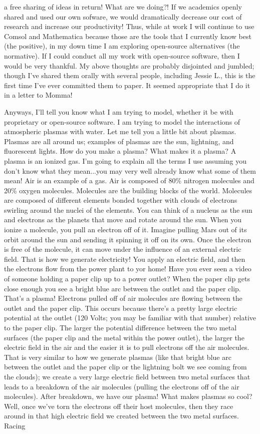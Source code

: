 \documentclass[11pt]{article}
\begin{document}
a free sharing of ideas in return! What are we doing?!  If we academics openly shared and used our own sofware, we would dramatically decrease our cost of research and increase our productivity! Thus, while at work I will continue to use Comsol and Mathematica because those are the tools that I currently know best (the positive), in my down time I am exploring open-source alternatives (the normative). If I could conduct all my work with open-source software, then I would be very thankful. My above thoughts are probably disjointed and jumbled; though I've shared them orally with several people, including Jessie L., this is the first time I've ever committed them to paper. It seemed appropriate that I do it in a letter to Momma!

Anyways, I'll tell you know what I am trying to model, whether it be with proprietary or open-source software. I am trying to model the interactions of atmospheric plasmas with water. Let me tell you a little bit about plasmas. Plasmas are all around us; examples of plasmas are the sun, lightning, and fluorescent lights. How do you make a plasma? What makes it a plasma? A plasma is an ionized gas. I'm going to explain all the terms I use assuming you don't know what they mean...you may very well already know what some of them mean! Air is an example of a gas. Air is composed of 80\% nitrogen molecules and 20\% oxygen molecules. Molecules are the building blocks of the world. Molecules are composed of different elements bonded together with clouds of electrons swirling around the nuclei of the elements. You can think of a nucleus as the sun and electrons as the planets that move and rotate around the sun. When you ionize a molecule, you pull an electron off of it. Imagine pulling Mars out of its orbit around the sun and sending it spinning it off on its own. Once the electron is free of the molecule, it can move under the influence of an external electric field. That is how we generate electricity! You apply an electric field, and then the electrons flow from the power plant to yor home! Have you ever seen a video of someone holding a paper clip up to a power outlet? When the paper clip gets close enough you see a bright blue arc between the outlet and the paper clip. That's a plasma! Electrons pulled off of air molecules are flowing between the outlet and the paper clip. This occurs because there's a pretty large electric potential at the outlet (120 Volts; you may be familiar with that number) relative to the paper clip. The larger the potential difference between the two metal surfaces (the paper clip and the metal within the power outlet), the larger the electric field in the air and the easier it is to pull electrons off the air molecules. That is very similar to how we generate plasmas (like that bright blue arc between the outlet and the paper clip or the lightning bolt we see coming from the clouds); we create a very large electric field between two metal surfaces that leads to a breakdown of the air molecules (pulling the electrons off of the air molecules). After breakdown, we have our plasma! What makes plasmas so cool? Well, once we've torn the electrons off their host molecules, then they race around in that high electric field we created between the two metal surfaces. Racing 
\end{document}
